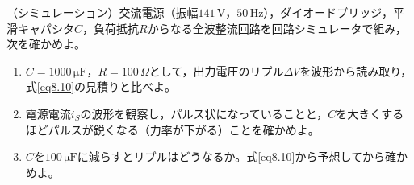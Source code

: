 \begin{章末問題}
\item \label{ex8.10}（シミュレーション）交流電源（振幅$141$\,V，$50$\,Hz），ダイオードブリッジ，平滑キャパシタ$C$，負荷抵抗$R$からなる全波整流回路を回路シミュレータで組み，次を確かめよ。
\begin{enumerate}
\item[(a)] $C = 1000\,\mathrm{\mu F}$，$R = 100\,\Omega$として，出力電圧のリプル$\mathit{\Delta}V$を波形から読み取り，式\ref{eq8.10}の見積りと比べよ。
\item[(b)] 電源電流$i_S$の波形を観察し，パルス状になっていることと，$C$を大きくするほどパルスが鋭くなる（力率が下がる）ことを確かめよ。
\item[(c)] $C$を$100\,\mathrm{\mu F}$に減らすとリプルはどうなるか。式\ref{eq8.10}から予想してから確かめよ。
\end{enumerate}
\end{章末問題}

